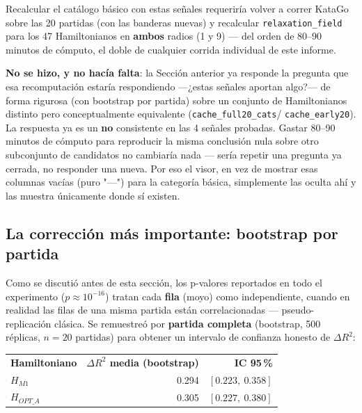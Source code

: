 \documentclass[11pt, a4paper]{article}
\newcommand{\TH}[1]{\cellcolor{cTHbg}\color{white}\textbf{#1}}
\begin{document}
Recalcular el cat\'alogo b\'asico con estas se\~nales requerir\'ia
volver a correr KataGo sobre las 20 partidas (con las banderas nuevas)
y recalcular \texttt{relaxation\_field} para los 47 Hamiltonianos en
\textbf{ambos} radios (1 y 9) --- del orden de 80--90 minutos de
c\'omputo, el doble de cualquier corrida individual de este informe.

\begin{tcolorbox}[quotebox]
  \textbf{No se hizo, y no hac\'ia falta}: la Secci\'on anterior ya
  responde la pregunta que esa recomputaci\'on estar\'ia respondiendo
  ---¿estas se\~nales aportan algo?--- de forma rigurosa (con bootstrap
  por partida) sobre un conjunto de Hamiltonianos distinto pero
  conceptualmente equivalente (\texttt{cache\_full20\_cats}/%
  \texttt{cache\_early20}). La respuesta ya es un \textbf{no}
  consistente en las 4 se\~nales probadas. Gastar 80--90 minutos de
  c\'omputo para reproducir la misma conclusi\'on nula sobre otro
  subconjunto de candidatos no cambiar\'ia nada --- ser\'ia repetir una
  pregunta ya cerrada, no responder una nueva. Por eso el visor,
  en vez de mostrar esas columnas vac\'ias (puro "—") para la
  categor\'ia b\'asica, simplemente las oculta ah\'i y las muestra
  \'unicamente donde s\'i existen.
\end{tcolorbox}

\subsection{La correcci\'on m\'as importante: bootstrap por partida}
\label{sec:bootstrap}

Como se discuti\'o antes de esta secci\'on, los p-valores reportados en
todo el experimento ($p\approx10^{-16}$) tratan cada \textbf{fila}
(moyo) como independiente, cuando en realidad las filas de una misma
partida est\'an correlacionadas --- pseudo-replicaci\'on cl\'asica. Se
remuestre\'o por \textbf{partida completa} (bootstrap, 500 r\'eplicas,
$n=20$ partidas) para obtener un intervalo de confianza honesto de
$\Delta R^2$:

\medskip
\begin{center}
\begin{tabular}{lrr}
  \TH{Hamiltoniano} & \TH{$\Delta R^2$ media (bootstrap)} & \TH{IC 95\,\%} \\[1pt]
  $H_{M1}$      & 0.294 & $[0.223,\ 0.358]$ \\
  $H_{OPT\_A}$  & 0.305 & $[0.227,\ 0.380]$ \\
\end{tabular}
\end{center}
\medskip
\end{document}
